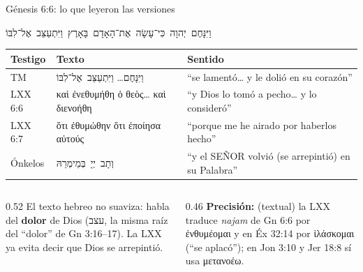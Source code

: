 \documentclass[hyperref={bookmarks=false},aspectratio=169]{beamer}
\newcommand{\heb}[1]{\mbox{\foreignlanguage{hebrew}{#1}}}
\newcommand{\grc}[1]{\foreignlanguage{ancientgreek}{#1}}
\newcommand{\SENOR}{S{\fontsize{0.78em}{1em}\selectfont EÑOR}}
\newcommand{\destacar}[1]{\textbf{\textcolor{azul}{#1}}}
\newcommand{\precision}[1]{{\footnotesize\color{gris}\textbf{Precisión:} #1}}
\begin{document}
\begin{frame}{Génesis 6:6: lo que leyeron las versiones}
\begin{center}\heb{וַיִּנָּחֶם יְהוָה כִּי־עָשָׂה אֶת־הָאָדָם בָּאָרֶץ וַיִּתְעַצֵּב אֶל־לִבּוֹ}\end{center}
\scriptsize\renewcommand{\arraystretch}{1.2}
\begin{tabular}{@{}>{\RaggedRight\arraybackslash}p{2.3cm}>{\RaggedRight\arraybackslash}p{5.3cm}>{\RaggedRight\arraybackslash}p{4.2cm}@{}}
\toprule
\textbf{Testigo} & \textbf{Texto} & \textbf{Sentido} \\ \midrule
TM & \heb{וַיִּנָּחֶם}\ldots{} \heb{וַיִּתְעַצֵּב אֶל־לִבּוֹ} & ``se lamentó\ldots{} y le dolió en su corazón'' \\
LXX 6:6 & \grc{καὶ ἐνεθυμήθη ὁ θεὸς\ldots{} καὶ διενοήθη} & ``y Dios lo tomó a pecho\ldots{} y lo consideró'' \\
LXX 6:7 & \grc{ὅτι ἐθυμώθην ὅτι ἐποίησα αὐτούς} & ``porque me he airado por haberlos hecho'' \\
Ónkelos & \heb{וְתָב יְיָ בְּמֵימְרֵהּ} & ``y el \SENOR{} volvió (se arrepintió) en su Palabra'' \\
\bottomrule
\end{tabular}\par\medskip
\begin{columns}[t,onlytextwidth]
\begin{column}{0.52\textwidth}\small
El texto hebreo no suaviza: habla del \destacar{dolor} de Dios (\heb{עצב}, la misma raíz del ``dolor'' de Gn 3:16--17). La LXX ya evita decir que Dios se arrepintió.
\end{column}
\begin{column}{0.46\textwidth}
\precision{(textual) la LXX traduce \emph{najam} de Gn 6:6 por \grc{ἐνθυμέομαι} y en Éx 32:14 por \grc{ἱλάσκομαι} (``se aplacó''); en Jon 3:10 y Jer 18:8 sí usa \grc{μετανοέω}.}
\end{column}
\end{columns}
\end{frame}
\end{document}
